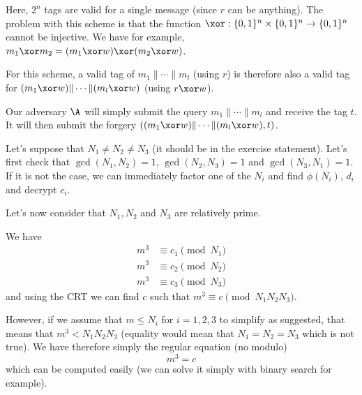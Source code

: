 \begin{solution}
	Here, $2^n$ tags are valid for a single message (since $r$ can be anything).
	The problem with this scheme is that the function $\xor: \{0,1\}^n \times \{0,1\}^n \to \{0,1\}^n$
	cannot be injective.
	We have for example, $m_1 \xor m_2 = (m_1 \xor w) \xor (m_2 \xor w)$.
	
	For this scheme, a valid tag of $m_1 \| \cdots \| m_l$ (using $r$)
	is therefore also a valid tag for $(m_1 \xor w) \| \cdots \| (m_l \xor w)$ (using $r \xor w$).
	
	Our adversary $\A$ will simply submit the query $m_1 \| \cdots \| m_l$ and receive the tag $t$.
	It will then submit the forgery $((m_1 \xor w) \| \cdots \| (m_l \xor w), t)$.
\end{solution}


\begin{solution}
	Let's suppose that $N_1 \neq N_2 \neq N_3$ (it should be in the exercise statement).
	Let's first check that $\gcd(N_1,N_2) = 1$, $\gcd(N_2,N_3) = 1$ and $\gcd(N_3,N_1) = 1$.
	If it is not the case, we can immediately factor one of the $N_i$ and find $\phi(N_i)$, $d_i$ and decrypt $c_i$.
	
	Let's now consider that $N_1, N_2$ and $N_3$ are relatively prime.
	
	We have
	\begin{align*}
		m^3 & \equiv c_1 \pmod{N_1}\\
		m^3 & \equiv c_2 \pmod{N_2}\\
		m^3 & \equiv c_3 \pmod{N_3}
	\end{align*}
	and using the CRT we can find $c$ such that $m^3 \equiv c \pmod{N_1N_2N_3}$.
	
	However, if we assume that $m \leq N_i$ for $i = 1, 2, 3$ to simplify as suggested,
	that means that $m^3 < N_1N_2N_3$ (equality would mean that $N_1=N_2=N_3$ which is not true).
	We have therefore simply the regular equation (no modulo)
	\[ m^3 = c \]
	which can be computed easily (we can solve it simply with binary search for example).
\end{solution}

